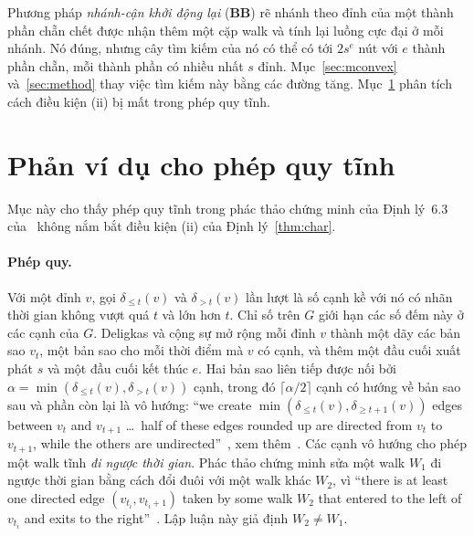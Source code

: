 \documentclass[pdflatex,sn-mathphys-num]{sn-jnl}
\theoremstyle{thmstyleone}%
\theoremstyle{thmstyletwo}%
\theoremstyle{thmstylethree}%
\begin{document}
Phương pháp \emph{nhánh-cận khởi động lại} (\textbf{BB}) rẽ nhánh theo đỉnh của một thành phần chẵn chết được nhận thêm một cặp walk và tính lại luồng cực đại ở mỗi nhánh. Nó đúng, nhưng cây tìm kiếm của nó có thể có tới $2s^{e}$ nút với $e$ thành phần chẵn, mỗi thành phần có nhiều nhất $s$ đỉnh. Mục~\ref{sec:mconvex} và~\ref{sec:method} thay việc tìm kiếm này bằng các đường tăng. Mục~\ref{sec:counterexample} phân tích cách điều kiện (ii) bị mất trong phép quy tĩnh.


\section{Phản ví dụ cho phép quy tĩnh}\label{sec:counterexample}

Mục này cho thấy phép quy tĩnh trong phác thảo chứng minh của Định lý~6.3 của~\cite{deligkas2025} không nắm bắt điều kiện (ii) của Định lý~\ref{thm:char}.

\paragraph{Phép quy.} Với một đỉnh $v$, gọi $\delta_{\le t}(v)$ và $\delta_{>t}(v)$ lần lượt là số cạnh kề với nó có nhãn thời gian không vượt quá $t$ và lớn hơn $t$. Chỉ số trên $G$ giới hạn các số đếm này ở các cạnh của $G$. Deligkas và cộng sự mở rộng mỗi đỉnh $v$ thành một dãy các bản sao $v_t$, một bản sao cho mỗi thời điểm mà $v$ có cạnh, và thêm một đầu cuối xuất phát $s$ và một đầu cuối kết thúc $e$. Hai bản sao liên tiếp được nối bởi $\alpha=\min(\delta_{\le t}(v),\delta_{>t}(v))$ cạnh, trong đó $\lceil\alpha/2\rceil$ cạnh có hướng về bản sao sau và phần còn lại là vô hướng: ``we create $\min(\delta_{\le t}(v),\delta_{\ge t+1}(v))$ edges between $v_t$ and $v_{t+1}$ \dots\ half of these edges rounded up are directed from $v_t$ to $v_{t+1}$, while the others are undirected''~\cite[tr.~26503]{deligkas2025}, xem thêm~\cite{deligkas2024arxiv}. Các cạnh vô hướng cho phép một walk tĩnh \emph{đi ngược thời gian}. Phác thảo chứng minh sửa một walk $W_1$ đi ngược thời gian bằng cách đổi đuôi với một walk khác $W_2$, vì ``there is at least one directed edge $(v_{t_i},v_{t_i+1})$ taken by some walk $W_2$ that entered to the left of $v_{t_i}$ and exits to the right''~\cite[tr.~26503--26504]{deligkas2025}. Lập luận này giả định $W_2\ne W_1$.
\end{document}
